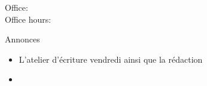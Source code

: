\documentclass{beamer}
\subtitle[Fruits et légumes, quantités et \lexi{en})]{Les fruits et légumes, les quantités et le pronom \lexi{en}}
\begin{document}
  \begin{frame}
    \titlepage
    \tiny{Office: \\
          Office hours: }
  \end{frame}

  \begin{frame}{Annonces}
    \begin{itemize}
      \item L'atelier d'écriture vendredi ainsi que la rédaction
      \item[] 
    \end{itemize}
  \end{frame}

\end{document}
